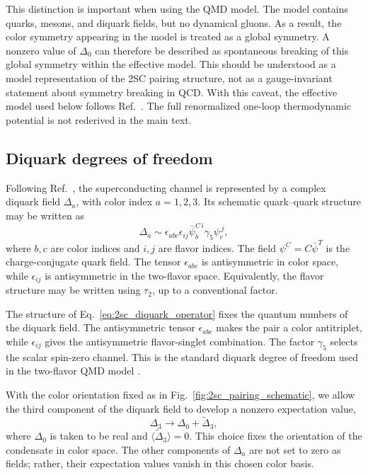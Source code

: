 This distinction is important when using the QMD model.
The model contains quarks, mesons, and diquark fields, but no dynamical
gluons. As a result, the color symmetry appearing in the model is treated
as a global symmetry. A nonzero value of \(\Delta_0\) can therefore be
described as spontaneous breaking of this global symmetry within the
effective model. This should be understood as a model representation of
the 2SC pairing structure, not as a gauge-invariant statement about
symmetry breaking in QCD. With this caveat, the effective model used
below follows Ref.~\cite{Andersen2024}. The full renormalized one-loop
thermodynamic potential is not rederived in the main text.

\subsection*{Diquark degrees of freedom}

Following Ref.~\cite{Andersen2024}, the superconducting channel is
represented by a complex diquark field \(\Delta_a\), with color index
\(a=1,2,3\). Its schematic quark--quark structure may be written as
\begin{equation}
\Delta_a
\sim
\epsilon_{abc}\epsilon_{ij}
\bar{\psi}^{C\,i}_b \gamma_5 \psi^{\,j}_c ,
\label{eq:2sc_diquark_operator}
\end{equation}
where \(b,c\) are color indices and \(i,j\) are flavor indices. The field
\(\psi^C=C\bar{\psi}^T\) is the charge-conjugate quark field. The tensor
\(\epsilon_{abc}\) is antisymmetric in color space, while
\(\epsilon_{ij}\) is antisymmetric in the two-flavor space. Equivalently,
the flavor structure may be written using \(\tau_2\), up to a conventional
factor.

The structure of Eq.~\eqref{eq:2sc_diquark_operator} fixes the quantum
numbers of the diquark field. The antisymmetric tensor
\(\epsilon_{abc}\) makes the pair a color antitriplet, while
\(\epsilon_{ij}\) gives the antisymmetric flavor-singlet combination. The
factor \(\gamma_5\) selects the scalar spin-zero channel. This is the
standard diquark degree of freedom used in the two-flavor QMD model
\cite{Shovkovy2005,Andersen2024}.

With the color orientation fixed as in
Fig.~\ref{fig:2sc_pairing_schematic}, we allow the third component of the
diquark field to develop a nonzero expectation value,
\begin{equation}
\Delta_3 \rightarrow \Delta_0 + \tilde{\Delta}_3 ,
\label{eq:2sc_condensate_choice}
\end{equation}
where \(\Delta_0\) is taken to be real and
\(\langle \tilde{\Delta}_3\rangle=0\). This choice fixes the orientation
of the condensate in color space. The other components of \(\Delta_a\) are
not set to zero as fields; rather, their expectation values vanish in this
chosen color basis.

